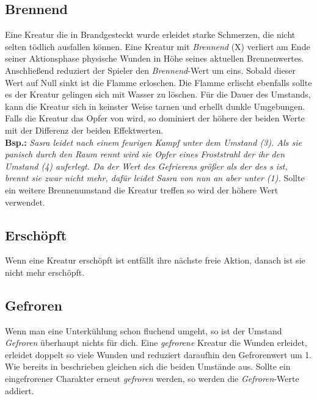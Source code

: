 \subsection*{Brennend} \label{ef:brennend}
Eine Kreatur die in Brandgesteckt wurde erleidet starke Schmerzen, die nicht selten tödlich ausfallen können. Eine Kreatur mit \textit{Brennend} (X) verliert am Ende seiner Aktionsphase physische Wunden in Höhe seines aktuellen Brennenwertes. Anschließend reduziert der Spieler den \textit{Brennend}-Wert um eins. Sobald dieser Wert auf Null sinkt ist die Flamme erloschen. Die Flamme erlischt ebenfalls sollte es der Kreatur gelingen sich mit Wasser zu löschen. Für die Dauer des Umstands, kann die Kreatur sich in keinster Weise tarnen und erhellt dunkle Umgebungen. Falls die Kreatur das Opfer von \textit{} wird, so dominiert der höhere der beiden Werte mit der Differenz der beiden Effektwerten. \\
\textbf{Bsp.:} \textit{Sasra leidet nach einem feurigen Kampf unter dem Umstand  (3). Als sie panisch durch den Raum rennt wird sie Opfer eines Froststrahl der ihr den Umstand  (4) auferlegt. Da der Wert des Gefrierens größer als der des s ist, brennt sie zwar nicht mehr, dafür leidet Sasra von nun an aber unter  (1).}
Sollte ein weitere Brennenumstand die Kreatur treffen so wird der höhere Wert verwendet.

\subsection*{Erschöpft} \label{ef:erschoepft}
Wenn eine Kreatur erschöpft ist entfällt ihre nächste freie Aktion, danach ist sie nicht mehr erschöpft.

\subsection*{Gefroren} \label{ef:gefroren}
Wenn man eine Unterkühlung schon fluchend umgeht, so ist der Umstand \textit{Gefroren} überhaupt nichts für dich. Eine \textit{gefrorene} Kreatur die Wunden erleidet, erleidet doppelt so viele Wunden und reduziert daraufhin den Gefrorenwert um 1. Wie bereits in \textit{} beschrieben gleichen sich die beiden Umstände aus. Sollte ein eingefrorener Charakter erneut \textit{gefroren} werden, so werden die \textit{Gefroren}-Werte addiert.

